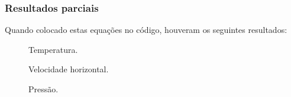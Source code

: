 \documentclass[xcolor=dvipsnames,10pt,aspectratio=169]{beamer}
\begin{document}
	\begin{frame}
		\frametitle{Resultados parciais}
		Quando colocado estas equações no código, houveram os seguintes resultados:\\
		\vspace{1cm}
		\begin{minipage}[h!]{0.31\textwidth}
			\begin{figure}
				\label{gif1}
				\caption{Temperatura.}
			\end{figure}
		\end{minipage}
		\begin{minipage}[h!]{0.31\textwidth}
			\begin{figure}
				\label{gif2}
				\caption{Velocidade horizontal.}
			\end{figure}
		\end{minipage}
		\begin{minipage}[h!]{0.31\textwidth}
			\begin{figure}
				\label{gif3}
				\caption{Pressão.}
			\end{figure}
		\end{minipage}

	\end{frame}
\end{document}
